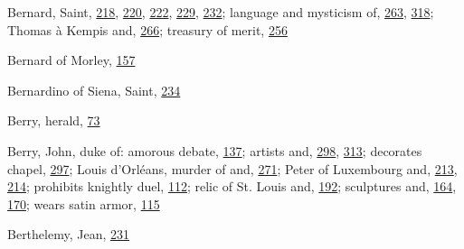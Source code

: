 Bernard, Saint,
\protect\hyperlink{14_Chapter_Seven__THE_PIOUS_PERSONA.xhtmlux5cux23page_218}{218},
\protect\hyperlink{15_Chapter_Eight__RELIGIOUS_EXCITAT.xhtmlux5cux23page_220}{220},
\protect\hyperlink{15_Chapter_Eight__RELIGIOUS_EXCITAT.xhtmlux5cux23page_222}{222},
\protect\hyperlink{15_Chapter_Eight__RELIGIOUS_EXCITAT.xhtmlux5cux23page_229}{229},
\protect\hyperlink{15_Chapter_Eight__RELIGIOUS_EXCITAT.xhtmlux5cux23page_232}{232};
language and mysticism of,
\protect\hyperlink{17_Chapter_Ten__THE_FAILURE_OF_IMAG.xhtmlux5cux23page_263}{263},
\protect\hyperlink{20_ILLUSTRATIONS_FOLLOW_PAGE.xhtmlux5cux23page_318}{318};
Thomas à Kempis and,
\protect\hyperlink{17_Chapter_Ten__THE_FAILURE_OF_IMAG.xhtmlux5cux23page_266}{266};
treasury of merit,
\protect\hyperlink{17_Chapter_Ten__THE_FAILURE_OF_IMAG.xhtmlux5cux23page_256}{256}

Bernard of Morley,
\protect\hyperlink{12_Chapter_Five__THE_VISION_OF_DEAT.xhtmlux5cux23page_157}{157}

Bernardino of Siena, Saint,
\protect\hyperlink{16_Chapter_Nine__THE_DECLINE_OF_SYM.xhtmlux5cux23page_234}{234}

Berry, herald,
\protect\hyperlink{10_Chapter_Three__THE_HEROIC_DREAM.xhtmlux5cux23page_73}{73}

Berry, John, duke of: amorous debate,
\protect\hyperlink{11_Chapter_Four__THE_FORMS_OF_LOVE.xhtmlux5cux23page_137}{137};
artists and,
\protect\hyperlink{20_ILLUSTRATIONS_FOLLOW_PAGE.xhtmlux5cux23page_298}{298},
\protect\hyperlink{20_ILLUSTRATIONS_FOLLOW_PAGE.xhtmlux5cux23page_313}{313};
decorates chapel,
\protect\hyperlink{19_Chapter_Twelve__ART_IN_LIFE.xhtmlux5cux23page_297}{297};
Louis d'Orléans, murder of and,
\protect\hyperlink{18_Chapter_Eleven__THE_FORMS_OF_THO.xhtmlux5cux23page_271}{271};
Peter of Luxembourg and,
\protect\hyperlink{14_Chapter_Seven__THE_PIOUS_PERSONA.xhtmlux5cux23page_213}{213},
\protect\hyperlink{14_Chapter_Seven__THE_PIOUS_PERSONA.xhtmlux5cux23page_214}{214};
prohibits knightly duel,
\protect\hyperlink{10_Chapter_Three__THE_HEROIC_DREAM.xhtmlux5cux23page_112}{112};
relic of St. Louis and,
\protect\hyperlink{13_Chapter_Six__THE_DEPICTION_OF_TH.xhtmlux5cux23page_192}{192};
sculptures and,
\protect\hyperlink{12_Chapter_Five__THE_VISION_OF_DEAT.xhtmlux5cux23page_164}{164},
\protect\hyperlink{12_Chapter_Five__THE_VISION_OF_DEAT.xhtmlux5cux23page_170}{170};
wears satin armor,
\protect\hyperlink{10_Chapter_Three__THE_HEROIC_DREAM.xhtmlux5cux23page_115}{115}

Berthelemy, Jean,
\protect\hyperlink{15_Chapter_Eight__RELIGIOUS_EXCITAT.xhtmlux5cux23page_231}{231}

